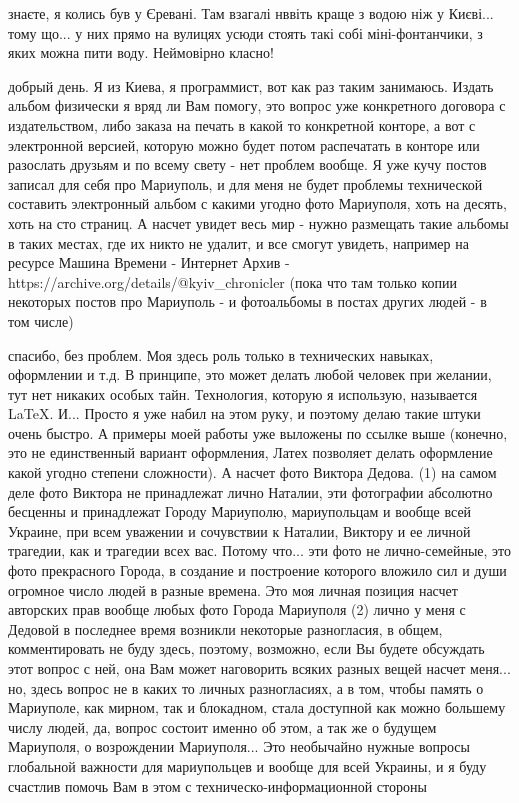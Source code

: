 знаєте, я колись був у Єревані. Там взагалі нввіть краще з водою ніж у Києві...
тому що... у них прямо на вулицях усюди стоять такі собі міні-фонтанчики, з
яких можна пити воду. Неймовірно класно!


добрый день. Я из Киева, я программист, вот как раз таким занимаюсь. Издать
альбом физически я вряд ли Вам помогу, это вопрос уже конкретного договора с
издательством, либо заказа на печать в какой то конкретной конторе, а вот с
электронной версией, которую можно будет потом распечатать в конторе или
разослать друзьям и по всему свету - нет проблем вообще. Я уже кучу постов
записал для себя про Мариуполь, и для меня не будет проблемы технической
составить электронный альбом с какими угодно фото Мариуполя, хоть на десять,
хоть на сто страниц. А насчет увидет весь мир - нужно размещать такие альбомы в
таких местах, где их никто не удалит, и все смогут увидеть, например на ресурсе
Машина Времени - Интернет Архив - https://archive.org/details/@kyiv_chronicler
(пока что там только копии некоторых постов про Мариуполь - и фотоальбомы в
постах других людей - в том числе)

спасибо, без проблем. Моя здесь роль только в технических навыках, оформлении и
т.д. В принципе, это может делать любой человек при желании, тут нет никаких
особых тайн. Технология, которую я использую, называется LaTeX. И... Просто я
уже набил на этом руку, и поэтому делаю такие штуки очень быстро. А примеры
моей работы уже выложены по ссылке выше (конечно, это не единственный вариант
оформления, Латех позволяет делать оформление какой угодно степени сложности).
А насчет фото Виктора Дедова. (1) на самом деле фото Виктора не принадлежат
лично Наталии, эти фотографии абсолютно бесценны и принадлежат Городу
Мариуполю, мариупольцам и вообще всей Украине, при всем уважении и сочувствии к
Наталии, Виктору и ее личной трагедии, как и трагедии всех вас. Потому что...
эти фото не лично-семейные, это фото прекрасного Города, в создание и
построение которого вложило сил и души огромное число людей в разные времена.
Это моя личная позиция насчет авторских прав вообще любых фото Города Мариуполя
(2) лично у меня с Дедовой в последнее время возникли некоторые разногласия, в
общем, комментировать не буду здесь, поэтому, возможно, если Вы будете
обсуждать этот вопрос с ней, она Вам может наговорить всяких разных вещей
насчет меня... но, здесь вопрос не в каких то личных разногласиях, а в том,
чтобы память о Мариуполе, как мирном, так и блокадном, стала доступной как
можно большему числу людей, да, вопрос состоит именно об этом, а так же о
будущем Мариуполя, о возрождении Мариуполя... Это необычайно нужные вопросы
глобальной важности для мариупольцев и вообще для всей Украины, и я буду
счастлив помочь Вам в этом с техническо-информационной стороны 
